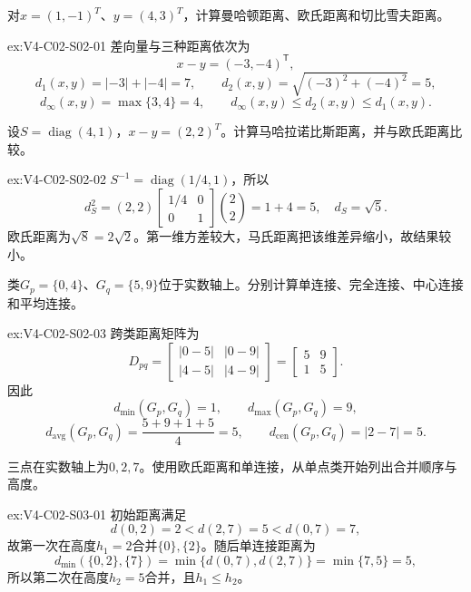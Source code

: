 \begin{SLChapterExercisePairSection}
\begin{exercise}\label{ex:V4-C02-S02-01}
对$x=(1,-1)^T$、$y=(4,3)^T$，计算曼哈顿距离、欧氏距离和切比雪夫距离。
\end{exercise}
\ifSLFullEdition
{}\label{sol:V4-C02-S02-01}
\begin{chapterexercisesolution}{ex:V4-C02-S02-01}
差向量与三种距离依次为
\[
x-y=(-3,-4)^{\mathsf T},
\]
\[
d_1(x,y)=|-3|+|-4|=7,
\qquad
d_2(x,y)=\sqrt{(-3)^2+(-4)^2}=5,
\]
\[
d_\infty(x,y)=\max\{3,4\}=4,
\qquad
d_\infty(x,y)\le d_2(x,y)\le d_1(x,y).
\]
\end{chapterexercisesolution}
\fi

\begin{exercise}\label{ex:V4-C02-S02-02}
设$S=\operatorname{diag}(4,1)$，$x-y=(2,2)^T$。计算马哈拉诺比斯距离，并与欧氏距离比较。
\end{exercise}
\ifSLFullEdition
{}\label{sol:V4-C02-S02-02}
\begin{chapterexercisesolution}{ex:V4-C02-S02-02}
$S^{-1}=\operatorname{diag}(1/4,1)$，所以
\[
d_S^2=(2,2)\begin{bmatrix}1/4&0\\0&1\end{bmatrix}\binom22=1+4=5,
\quad d_S=\sqrt5.
\]
欧氏距离为$\sqrt8=2\sqrt2$。第一维方差较大，马氏距离把该维差异缩小，故结果较小。
\end{chapterexercisesolution}
\fi

\begin{exercise}\label{ex:V4-C02-S02-03}
类$G_p=\{0,4\}$、$G_q=\{5,9\}$位于实数轴上。分别计算单连接、完全连接、中心连接和平均连接。
\end{exercise}
\ifSLFullEdition
{}\label{sol:V4-C02-S02-03}
\begin{chapterexercisesolution}{ex:V4-C02-S02-03}
跨类距离矩阵为
\[
D_{pq}=\begin{bmatrix}|0-5|&|0-9|\\|4-5|&|4-9|\end{bmatrix}
=\begin{bmatrix}5&9\\1&5\end{bmatrix}.
\]
因此
\[
d_{\min}(G_p,G_q)=1,
\qquad
d_{\max}(G_p,G_q)=9,
\]
\[
d_{\mathrm{avg}}(G_p,G_q)=\frac{5+9+1+5}{4}=5,
\qquad
d_{\mathrm{cen}}(G_p,G_q)=|2-7|=5.
\]
\end{chapterexercisesolution}
\fi

\begin{exercise}\label{ex:V4-C02-S03-01}
三点在实数轴上为$0,2,7$。使用欧氏距离和单连接，从单点类开始列出合并顺序与高度。
\end{exercise}
\ifSLFullEdition
{}\label{sol:V4-C02-S03-01}
\begin{chapterexercisesolution}{ex:V4-C02-S03-01}
初始距离满足
\[
d(0,2)=2<d(2,7)=5<d(0,7)=7,
\]
故第一次在高度$h_1=2$合并$\{0\},\{2\}$。随后单连接距离为
\[
d_{\min}(\{0,2\},\{7\})
=\min\{d(0,7),d(2,7)\}
=\min\{7,5\}=5,
\]
所以第二次在高度$h_2=5$合并，且$h_1\le h_2$。
\end{chapterexercisesolution}
\fi


\end{SLChapterExercisePairSection}
